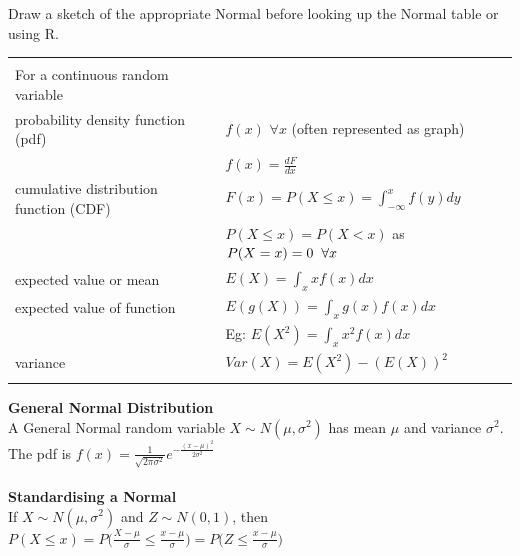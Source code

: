 \documentclass[bigtut]{tutorial}\usepackage[]{graphicx}\usepackage[]{color}
\begin{document}

\begin{tutorial}

\begin{displaybox}
Draw a sketch of the appropriate Normal before looking up the Normal table or using R.
\end{displaybox}

\begin{center}
\begin{tabular}{| ll |} \hline
& \\
For a continuous random variable & \\
probability density function (pdf) &   $f(x)$ $ \forall x$  \hspace{.5cm} (often represented as graph) \\
& $f(x) = \frac{dF}{dx} $ \\
cumulative distribution function (CDF) & $F(x) = P(X \leq x) = \int_{-\infty}^{x} f(y) dy$ \\
& $P(X \leq x) = P(X < x)$ \hspace{0.5cm} as $P(X=x) = 0  \hspace{0.2cm} \forall x$ \\
expected value or mean & $E(X) = \int_{x}^{} x f(x) dx$      \\ 
expected value of function  & $E(g(X)) = \int_{x}^{} g(x) f(x) dx$    \\
  & Eg: $E(X^2) = \int_{x}^{} x^2 f(x) dx$    \\
variance & $ Var(X) = E(X^2) - (E(X))^2 $ \\ 
& \\  \hline
\end{tabular}
\end{center}

\begin{displaybox}
{\bf General Normal Distribution}  \\ 
A General Normal random variable $X \sim N(\mu, \sigma^2)$ has mean $\mu$ and variance $\sigma^2$. \\

The pdf is 
$f(x)  =  \frac{1}{  \sqrt{2 \pi \sigma^2}  }  e^{   -\frac{ (x-\mu)^2 }{2 \sigma^2  }    }$ \\ \\

{\bf Standardising a Normal}  \\ 
If $X \sim N(\mu, \sigma^2)$ and $Z \sim N(0, 1)$, then \\
$P( X \leq x) = P \Big( \frac{X-\mu}{\sigma} \leq \frac{x-\mu}{\sigma}  \Big)= P \Big( Z \leq \frac{x-\mu}{\sigma}  \Big)$


\end{displaybox}
\end{tutorial}
\end{document}
